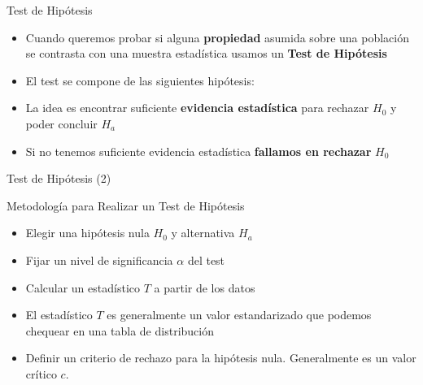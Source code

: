 \documentclass[handout]{beamer}
\begin{document}
\begin{frame}{Test de Hipótesis}
\scriptsize{
\begin{itemize}
 \item Cuando queremos probar si alguna \textbf{propiedad} asumida sobre una población se contrasta con una muestra estadística usamos un \textbf{Test de Hipótesis}
\item El test se compone de las siguientes hipótesis:
\item La idea es encontrar suficiente \textbf{evidencia estadística} para rechazar $H_{0}$ y poder concluir $H_{a}$
\item Si no tenemos suficiente evidencia estadística \textbf{fallamos en rechazar} $H_{0}$

\end{itemize}



} 
\end{frame}



\begin{frame}{Test de Hipótesis (2)}
\scriptsize{

\begin{block}{Metodología para Realizar un Test de Hipótesis}
\begin{itemize}
 \item Elegir una hipótesis nula $H_0$ y alternativa $H_a$
 \item Fijar un nivel de significancia $\alpha$ del test
 \item Calcular un estadístico $T$ a partir de los datos
 \item El estadístico $T$ es generalmente un valor estandarizado que podemos chequear en una tabla de distribución
 \item Definir un criterio de rechazo para la hipótesis nula. Generalmente es un valor crítico $c$.
\end{itemize}
\end{block}



} 
\end{frame}
\end{document}
